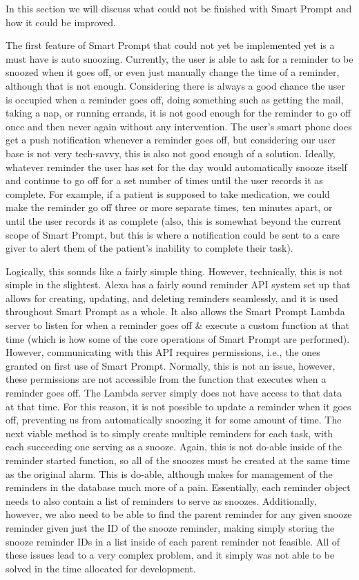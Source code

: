 \documentclass[11pt, oneside]{article}
\begin{document}
In this section we will discuss what could not be finished with Smart Prompt and how it could be improved. 

The first feature of Smart Prompt that could not yet be implemented yet is a must have is auto snoozing. 
Currently, the user is able to ask for a reminder to be snoozed when it goes off, or even just manually change the time of a reminder, although that is not enough. 
Considering there is always a good chance the user is occupied when a reminder goes off, doing something such as getting the mail, taking a nap, or running errands, it is not good enough for the reminder to go off once and then never again without any intervention. 
The user's smart phone does get a push notification whenever a reminder goes off, but considering our user base is not very tech-savvy, this is also not good enough of a solution. 
Ideally, whatever reminder the user has set for the day would automatically snooze itself and continue to go off for a set number of times until the user records it as complete. 
For example, if a patient is supposed to take medication, we could make the reminder go off three or more separate times, ten minutes apart, or until the user records it as complete (also, this is somewhat beyond the current scope of Smart Prompt, but this is where a notification could be sent to a care giver to alert them of the patient's inability to complete their task).

Logically, this sounds like a fairly simple thing. 
However, technically, this is not simple in the slightest. 
Alexa has a fairly sound reminder API system set up that allows for creating, updating, and deleting reminders seamlessly, and it is used throughout Smart Prompt as a whole. 
It also allows the Smart Prompt Lambda server to listen for when a reminder goes off \& execute a custom function at that time (which is how some of the core operations of Smart Prompt are performed).
However, communicating with this API requires permissions, i.e., the ones granted on first use of Smart Prompt. 
Normally, this is not an issue, however, these permissions are not accessible from the function that executes when a reminder goes off. 
The Lambda server simply does not have access to that data at that time. 
For this reason, it is not possible to update a reminder when it goes off, preventing us from automatically snoozing it for some amount of time. 
The next viable method is to simply create multiple reminders for each task, with each succeeding one serving as a snooze. 
Again, this is not do-able inside of the reminder started function, so all of the snoozes must be created at the same time as the original alarm. 
This is do-able, although makes for management of the reminders in the database much more of a pain. 
Essentially, each reminder object needs to also contain a list of reminders to serve as snoozes. 
Additionally, however, we also need to be able to find the parent reminder for any given snooze reminder given just the ID of the snooze reminder, making simply storing the snooze reminder IDs in a list inside of each parent reminder not feasible. 
All of these issues lead to a very complex problem, and it simply was not able to be solved in the time allocated for development. 
\end{document}
